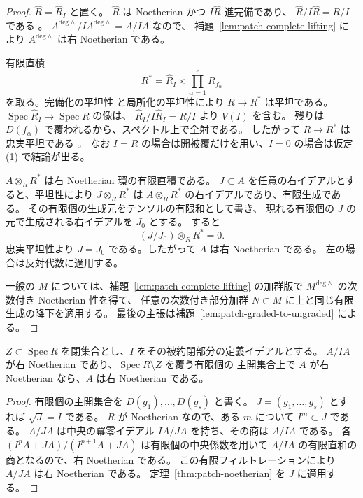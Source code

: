 \begin{proof}
$\widehat R=\widehat R_I$ と置く。
$\widehat R$ は Noetherian かつ $I\widehat R$ 進完備であり、
$\widehat R/I\widehat R=R/I$ である
\cite[Tags 031C, 05GH]{StacksCompletionPatching}。
$A^{\mathrm{deg}\wedge}/IA^{\mathrm{deg}\wedge}=A/IA$ なので、
補題~\ref{lem:patch-complete-lifting} により
$A^{\mathrm{deg}\wedge}$ は右 Noetherian である。

有限直積
\begin{equation}\label{eq:patch-faithful-cover}
 R^{\ast}=\widehat R_I\times\prod_{\alpha=1}^r R_{f_\alpha}
\end{equation}
を取る。完備化の平坦性 \cite[Tag 00MB]{StacksCompletionPatching} と局所化の平坦性により
$R\to R^{\ast}$ は平坦である。
$\operatorname{Spec}\widehat R_I\to\operatorname{Spec} R$ の像は、
$\widehat R_I/I\widehat R_I=R/I$ より $V(I)$ を含む。
残りは $D(f_\alpha)$ で覆われるから、スペクトル上で全射である。
したがって $R\to R^{\ast}$ は忠実平坦である
\cite[Tag 00HQ]{StacksCompletionPatching}。
なお $I=R$ の場合は開被覆だけを用い、$I=0$ の場合は仮定 (1) で結論が出る。

$A\otimes_R R^{\ast}$ は右 Noetherian 環の有限直積である。
$J\subset A$ を任意の右イデアルとすると、平坦性により
$J\otimes_R R^{\ast}$ は $A\otimes_R R^{\ast}$ の右イデアルであり、有限生成である。
その有限個の生成元をテンソルの有限和として書き、
現れる有限個の $J$ の元で生成される右イデアルを $J_0$ とする。
すると
\[
 (J/J_0)\otimes_R R^{\ast}=0.
\]
忠実平坦性より $J=J_0$ である。したがって $A$ は右 Noetherian である。
左の場合は反対代数に適用する。

一般の $M$ については、補題~\ref{lem:patch-complete-lifting} の加群版で
$M^{\mathrm{deg}\wedge}$ の次数付き Noetherian 性を得て、
任意の次数付き部分加群 $N\subset M$ に上と同じ有限生成の降下を適用する。
最後の主張は補題~\ref{lem:patch-graded-to-ungraded} による。
\end{proof}

\begin{corollary}[閉集合だけを指定した形]
$Z\subset\operatorname{Spec} R$ を閉集合とし、$I$ をその被約閉部分の定義イデアルとする。
$A/IA$ が右 Noetherian であり、$\operatorname{Spec} R\setminus Z$ を覆う有限個の
主開集合上で $A$ が右 Noetherian なら、$A$ は右 Noetherian である。
\end{corollary}

\begin{proof}
有限個の主開集合を $D(g_1),\ldots,D(g_s)$ と書く。
$J=(g_1,\ldots,g_s)$ とすれば $\sqrt J=I$ である。
$R$ が Noetherian なので、ある $m$ について $I^m\subset J$ である。
$A/JA$ は中央の冪零イデアル $IA/JA$ を持ち、その商は $A/IA$ である。
各 $(I^pA+JA)/(I^{p+1}A+JA)$ は有限個の中央係数を用いて
$A/IA$ の有限直和の商となるので、右 Noetherian である。
この有限フィルトレーションにより $A/JA$ は右 Noetherian である。
定理~\ref{thm:patch-noetherian} を $J$ に適用する。
\end{proof}

